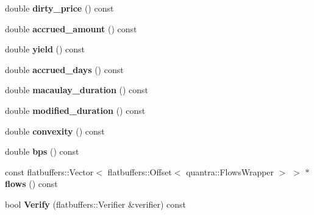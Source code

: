 \begin{DoxyCompactItemize}
double {\bfseries dirty\+\_\+price} () const
\item 
\mbox{\label{structquantra_1_1FLATBUFFERS__FINAL__CLASS_a0643043a0955ed743ba0143c81e8328c}} 
double {\bfseries accrued\+\_\+amount} () const
\item 
\mbox{\label{structquantra_1_1FLATBUFFERS__FINAL__CLASS_a842401d75722e096a4487010b128f8d4}} 
double {\bfseries yield} () const
\item 
\mbox{\label{structquantra_1_1FLATBUFFERS__FINAL__CLASS_a90fe1e641ce101183f3e461986c117d3}} 
double {\bfseries accrued\+\_\+days} () const
\item 
\mbox{\label{structquantra_1_1FLATBUFFERS__FINAL__CLASS_a1d59e2a282fc5d88f2c5bc6dd17d645d}} 
double {\bfseries macaulay\+\_\+duration} () const
\item 
\mbox{\label{structquantra_1_1FLATBUFFERS__FINAL__CLASS_a1842a6a495702c8eb1741d7aa4720825}} 
double {\bfseries modified\+\_\+duration} () const
\item 
\mbox{\label{structquantra_1_1FLATBUFFERS__FINAL__CLASS_af391310ac92439c54d96f3d1de46f779}} 
double {\bfseries convexity} () const
\item 
\mbox{\label{structquantra_1_1FLATBUFFERS__FINAL__CLASS_a8678dc57d7507a5c42fb38f6e5e9d7be}} 
double {\bfseries bps} () const
\item 
\mbox{\label{structquantra_1_1FLATBUFFERS__FINAL__CLASS_aadf140966c400eb42ab77cc5049538a0}} 
const flatbuffers\+::\+Vector$<$ flatbuffers\+::\+Offset$<$ quantra\+::\+Flows\+Wrapper $>$ $>$ $\ast$ {\bfseries flows} () const
\item 
\mbox{\label{structquantra_1_1FLATBUFFERS__FINAL__CLASS_aed693ee5a45b5f53af7411f9cab6793a}} 
bool {\bfseries Verify} (flatbuffers\+::\+Verifier \&verifier) const

\end{DoxyCompactItemize}
